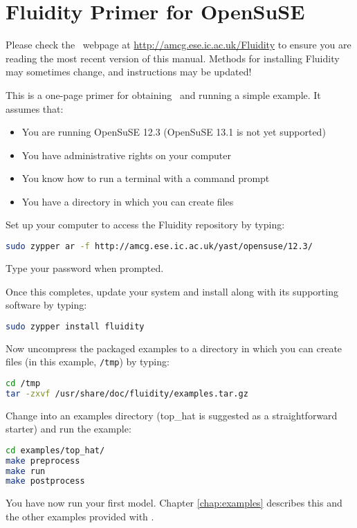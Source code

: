\chapter*{Fluidity Primer for OpenSuSE}

Please check the \fluidity\ webpage at
\href{http://amcg.ese.ic.ac.uk/Fluidity}{http://amcg.ese.ic.ac.uk/Fluidity}
to ensure you are reading the most recent version of this manual. Methods for
installing Fluidity may sometimes change, and instructions may be updated!

This is a one-page primer for obtaining \fluidity\ and running a simple example. It assumes that:

\begin{itemize}
 \item You are running OpenSuSE 12.3 (OpenSuSE 13.1 is not yet supported) 
 \item You have administrative rights on your computer
 \item You know how to run a terminal with a command prompt
 \item You have a directory in which you can create files
\end{itemize}

Set up your computer to access the Fluidity repository by typing:

\begin{lstlisting}[language=Bash]
sudo zypper ar -f http://amcg.ese.ic.ac.uk/yast/opensuse/12.3/
\end{lstlisting}

Type your password when prompted.

Once this completes, update your system and install \fluidity along with its
supporting software by typing:

\begin{lstlisting}[language=Bash]
sudo zypper install fluidity
\end{lstlisting}

Now uncompress the packaged examples to a directory in which you can create
files (in this example, \lstinline[language=Bash]+/tmp+) by typing:

\begin{lstlisting}[language=Bash]
cd /tmp
tar -zxvf /usr/share/doc/fluidity/examples.tar.gz
\end{lstlisting}

Change into an examples directory (top\_hat is suggested as a straightforward
starter) and run the example:

\begin{lstlisting}[language=Bash]
cd examples/top_hat/
make preprocess
make run
make postprocess
\end{lstlisting}

You have now run your first \fluidity model. Chapter \ref{chap:examples}
describes this and the other examples provided with \fluidity.  
